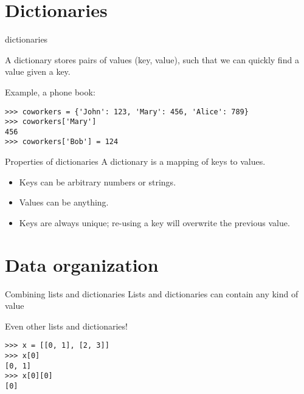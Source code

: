 \documentclass[aspectratio=169,usenames,dvipsnames]{beamer}
\begin{document}
\section{Dictionaries}
\frame{\tableofcontents[currentsection]}

\begin{frame}[fragile]{dictionaries}
    \begin{definition}
        A dictionary stores pairs of values (key, value),
        such that we can quickly find a value given a key.
    \end{definition}
Example, a phone book:
\begin{lstlisting}
>>> coworkers = {'John': 123, 'Mary': 456, 'Alice': 789}
>>> coworkers['Mary']
456
>>> coworkers['Bob'] = 124
\end{lstlisting}

\end{frame}

\begin{frame}{Properties of dictionaries}
A dictionary is a mapping of keys to values.

    \begin{itemize}
        \item Keys can be arbitrary numbers or strings.
        \item Values can be anything.
        \item Keys are always unique;
            re-using a key will overwrite the previous value.
    \end{itemize}
\end{frame}



\section{Data organization}
\frame{\tableofcontents[currentsection]}

\begin{frame}[fragile]{Combining lists and dictionaries}
Lists and dictionaries can contain any kind of value

Even other lists and dictionaries!

\begin{lstlisting}
>>> x = [[0, 1], [2, 3]]
>>> x[0]
[0, 1]
>>> x[0][0]
[0]
\end{lstlisting}
\end{frame}
\end{document}
